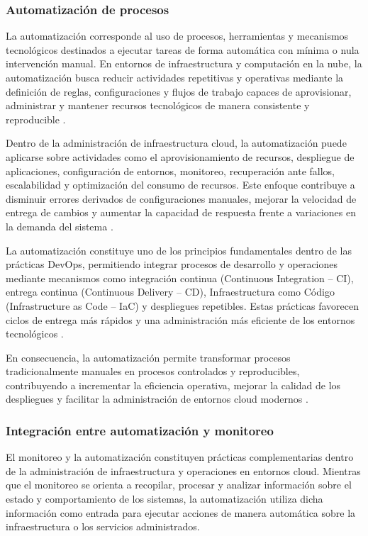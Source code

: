 \subsubsection{Automatización de procesos}

La automatización corresponde al uso de procesos, herramientas y mecanismos tecnológicos destinados a ejecutar tareas de forma automática con mínima o nula intervención manual. En entornos de infraestructura y computación en la nube, la automatización busca reducir actividades repetitivas y operativas mediante la definición de reglas, configuraciones y flujos de trabajo capaces de aprovisionar, administrar y mantener recursos tecnológicos de manera consistente y reproducible \parencite{RedHat2026}.

Dentro de la administración de infraestructura cloud, la automatización puede aplicarse sobre actividades como el aprovisionamiento de recursos, despliegue de aplicaciones, configuración de entornos, monitoreo, recuperación ante fallos, escalabilidad y optimización del consumo de recursos. Este enfoque contribuye a disminuir errores derivados de configuraciones manuales, mejorar la velocidad de entrega de cambios y aumentar la capacidad de respuesta frente a variaciones en la demanda del sistema \parencite{RedHat2026}.

La automatización constituye uno de los principios fundamentales dentro de las prácticas DevOps, permitiendo integrar procesos de desarrollo y operaciones mediante mecanismos como integración continua (Continuous Integration -- CI), entrega continua (Continuous Delivery -- CD), Infraestructura como Código (Infrastructure as Code -- IaC) y despliegues repetibles. Estas prácticas favorecen ciclos de entrega más rápidos y una administración más eficiente de los entornos tecnológicos \parencite{GoogleCloud2026}.

En consecuencia, la automatización permite transformar procesos tradicionalmente manuales en procesos controlados y reproducibles, contribuyendo a incrementar la eficiencia operativa, mejorar la calidad de los despliegues y facilitar la administración de entornos cloud modernos \parencite{RedHat2026, GoogleCloud2026}.

\subsubsection{Integración entre automatización y monitoreo}

El monitoreo y la automatización constituyen prácticas complementarias dentro de la administración de infraestructura y operaciones en entornos cloud. Mientras que el monitoreo se orienta a recopilar, procesar y analizar información sobre el estado y comportamiento de los sistemas, la automatización utiliza dicha información como entrada para ejecutar acciones de manera automática sobre la infraestructura o los servicios administrados.

